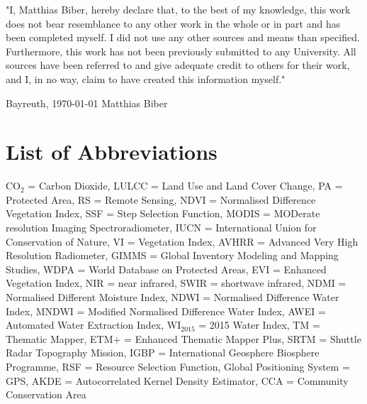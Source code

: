 \documentclass[12pt,a4paper, twoside, english]{article}
\begin{document}
"I, Matthias Biber, hereby declare that, to the best of my knowledge, this work does not bear resemblance to any other work in the whole or in part and has been completed myself. I did not use any other sources and means than specified. Furthermore, this work has not been previously submitted to any University. All sources have been referred to and give adequate credit to others for their work, and I, in no way, claim to have created this information myself." \\

\par
\vspace{2ex}

Bayreuth, \today{} \hfill Matthias Biber
\newpage
{}

\renewcommand{\baselinestretch}{1}\normalsize

\clearpage
\renewcommand{\contentsname}{Table of Contents}
\pdfbookmark{\contentsname}{Table of Contents}
\tableofcontents
\newpage
\listoffigures
\newpage
\listoftables

\section*{List of Abbreviations}

{\small
CO$_{2}$ = Carbon Dioxide, LULCC = Land Use and Land Cover Change, PA = Protected Area, RS = Remote Sensing, NDVI = Normalised Difference Vegetation Index, SSF = Step Selection Function, MODIS = MODerate resolution Imaging Spectroradiometer, IUCN = International Union for Conservation of Nature, VI = Vegetation Index, AVHRR = Advanced Very High Resolution Radiometer, GIMMS = Global Inventory Modeling and Mapping Studies, WDPA = World Database on Protected Areas, EVI = Enhanced Vegetation Index, NIR = near infrared, SWIR = shortwave infrared, NDMI = Normalised Different Moisture Index, NDWI = Normalised Difference Water Index, MNDWI = Modified Normalised Difference Water Index, AWEI = Automated Water Extraction Index, WI$_{2015}$ = 2015 Water Index, TM = Thematic Mapper, ETM+ = Enhanced Thematic Mapper Plus, SRTM = Shuttle Radar Topography Mission, IGBP = International Geosphere Biosphere Programme, RSF = Resource Selection Function, Global Positioning System = GPS, AKDE = Autocorrelated Kernel Density Estimator, CCA = Community Conservation Area
}
\end{document}
